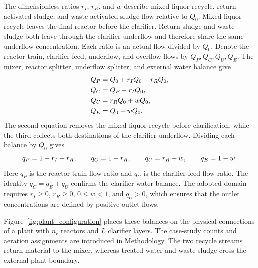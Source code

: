 The dimensionless ratios $r_I$, $r_R$, and $w$ describe mixed-liquor recycle, return activated sludge, and waste activated sludge flow relative to $Q_0$. Mixed-liquor recycle leaves the final reactor before the clarifier. Return sludge and waste sludge both leave through the clarifier underflow and therefore share the same underflow concentration. Each ratio is an actual flow divided by $Q_0$. Denote the reactor-train, clarifier-feed, underflow, and overflow flows by $Q_P,Q_C,Q_U,Q_E$. The mixer, reactor splitter, underflow splitter, and external water balance give
\begin{align}
\equationname{Reactor-train flow including both recycle streams}
Q_P&=Q_0+r_IQ_0+r_RQ_0,\\
\equationname{Clarifier-feed flow after mixed-liquor recycle withdrawal}
Q_C&=Q_P-r_IQ_0,\\
\equationname{Clarifier underflow split into return sludge and waste sludge}
Q_U&=r_RQ_0+wQ_0,\\
\equationname{Effluent flow after waste withdrawal}
Q_E&=Q_0-wQ_0.
\end{align}
The second equation removes the mixed-liquor recycle before clarification, while the third collects both destinations of the clarifier underflow. Dividing each balance by $Q_0$ gives
\begin{equation}
\equationname{Plant flow ratios relative to fresh-influent flow}
q_P=1+r_I+r_R,\qquad q_C=1+r_R,\qquad
q_U=r_R+w,\qquad q_E=1-w.
\label{eq:plant_flows}
\end{equation}
Here $q_P$ is the reactor-train flow ratio and $q_C$ is the clarifier-feed flow ratio. The identity $q_C=q_E+q_U$ confirms the clarifier water balance. The adopted domain requires $r_I\ge0$, $r_R\ge0$, $0\le w<1$, and $q_U>0$, which ensures that the outlet concentrations are defined by positive outlet flows.

Figure~\ref{fig:plant_configuration} places these balances on the physical connections of a plant with $n_r$ reactors and $L$ clarifier layers. The case-study counts and aeration assignments are introduced in Methodology. The two recycle streams return material to the mixer, whereas treated water and waste sludge cross the external plant boundary.


